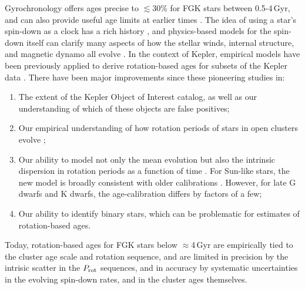 \documentclass[11pt,twocolumn,tighten]{aastex63}
\begin{document}
Gyrochronology offers ages precise to $\lesssim$30\% for FGK stars
between 0.5-4\,Gyr, and can also provide useful age limits at earlier
times \citep{Bouma_2023}.  The idea of using a star's spin-down as a
clock has a rich history
\citep{Skumanich_1972,Noyes_1984,Kawaler_1989,Barnes03,Mamajek_2008,Angus_2015},
and physics-based models for the spin-down itself can clarify many
aspects of how the stellar winds, internal structure, and magnetic
dynamo all evolve
\citep[e.g.][]{Matt_2015,Gallet_Bouvier_2015,Spada_2020}.  In the
context of Kepler, empirical models have been previously applied to
derive rotation-based ages for subsets of the Kepler data
\citep{Walkowicz_2013,Reinhold_2015,Angus_2018}.  There have been
major improvements since these pioneering studies in:
\begin{enumerate}[label={\it \roman*)},leftmargin=*,topsep=0pt,itemsep=-1ex,partopsep=1ex,parsep=1ex]
  \item The extent of the Kepler Object of Interest catalog, as well
    as our understanding of which of these objects are false
    positives;
  \item Our empirical understanding of how rotation periods of stars
    in open clusters evolve
    \citep[e.g.][]{Curtis_2019_ngc6811,Gillen_2020,Rampalli_2021,Fritzewski_2021,Rebull_2022,Dungee_2022,2023AJ....166...14B};
  \item Our ability to model not only the mean evolution but also the
    intrinsic dispersion in rotation periods as a function of time
    \citep{Bouma_2023}.  For Sun-like stars, the new model is broadly
    consistent with older calibrations \citep[e.g.][]{Mamajek_2008}.
    However, for late G dwarfs and K dwarfs, the age-calibration
    differs by factors of a few;
  \item Our ability to identify binary stars, which can be problematic
    for estimates of rotation-based ages.
\end{enumerate}
Today, rotation-based ages for FGK stars below $\approx$4\,Gyr are
empirically tied to the cluster age scale and rotation sequence, and
are limited in precision by the intrisic scatter in the $P_{\rm rot}$
sequences, and in accuracy by systematic uncertainties in the evolving
spin-down rates, and in the cluster ages themselves.  
\end{document}
